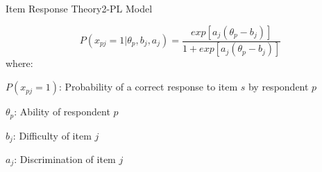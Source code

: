 \documentclass{beamer} %
\begin{document}
\begin{frame}{Item Response Theory}{2-PL Model}

				\begin{equation*}\label{eq:2pl}
				P(x_{pj} = 1|\theta_p, b_j, a_j) = \frac{exp[a_j(\theta_p - b_j)]}{1 + exp[a_j(\theta_p - b_j)]}
			\end{equation*}
		\vspace{3mm}
			where: 
		
			$P(x_{pj} = 1)$: Probability of a correct response to item $s$ by respondent $p$
			
				\vspace{1.5mm}
				
			$\theta_p$: Ability of respondent $p$
			
				\vspace{1.5mm}
			$b_j$: Difficulty of item $j$
			
				\vspace{1.5mm}
			$a_j$: Discrimination of item $j$



\end{frame}
\end{document}
